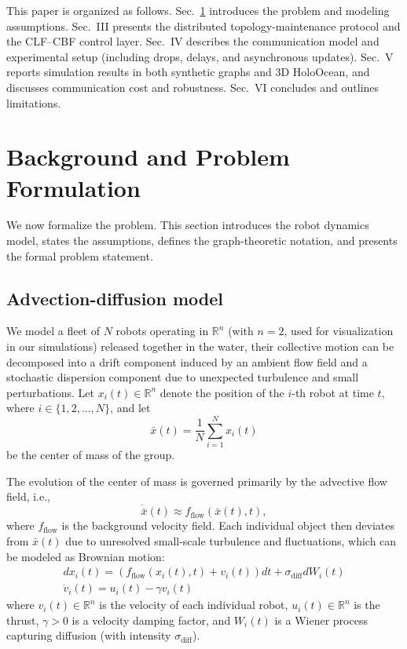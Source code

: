 \documentclass[conference]{IEEEconf}
\theoremstyle{plain}
\begin{document}
This paper is organized as follows. Sec.~\ref{sec:prob} introduces the problem and modeling assumptions. Sec.~III presents the distributed topology-maintenance protocol and the CLF--CBF control layer. Sec.~IV describes the communication model and experimental setup (including drops, delays, and asynchronous updates). Sec.~V reports simulation results in both synthetic graphs and 3D HoloOcean, and discusses communication cost and robustness. Sec.~VI concludes and outlines limitations.

\section{Background and Problem Formulation}\label{sec:prob}

We now formalize the problem. This section introduces the robot dynamics model, states the assumptions, defines the graph-theoretic notation, and presents the formal problem statement.
\subsection{Advection-diffusion model \cite{taylor1922, okubo1971, majda1999}}

We model a fleet of $N$ robots operating in $\mathbb{R}^n$ (with $n=2$, used for visualization in our simulations) released together in the water, their collective motion can be decomposed into a drift component induced by an ambient flow field and a stochastic dispersion component due to unexpected turbulence and small perturbations. Let $x_i(t) \in \mathbb{R}^n$ denote the position of the $i$-th robot at time $t$, where $i\in \{1,2,...,N\}$, and let  
\[
\bar{x}(t) = \frac{1}{N} \sum_{i=1}^N x_i(t)
\]  
be the center of mass of the group. 

The evolution of the center of mass is governed primarily by the advective flow field, i.e.,  
\[
\dot{\bar{x}}(t) \approx f_{\text{flow}}(\bar{x}(t),t),
\]  
where $f_{\text{flow}}$ is the background velocity field. Each individual object then deviates from $\bar{x}(t)$ due to unresolved small-scale turbulence and fluctuations, which can be modeled as Brownian motion:  
\begin{equation}
\begin{gathered}
    dx_i(t) = (f_{\text{flow}}(x_i(t), t) + v_i(t)) dt + \sigma_{\text{diff}} dW_i(t) \\
    \dot{v}_i(t) = u_i(t) - \gamma v_i(t)
\end{gathered}
\label{eq:advec_diff}
\end{equation}
\noindent where $v_i(t) \in \mathbb{R}^n$ is the velocity of each individual robot, $u_i(t) \in \mathbb{R}^n$ is the thrust, $\gamma > 0$ is a velocity damping factor, and $W_i(t)$ is a Wiener process capturing diffusion (with intensity $\sigma_{\text{diff}}$).
\end{document}
